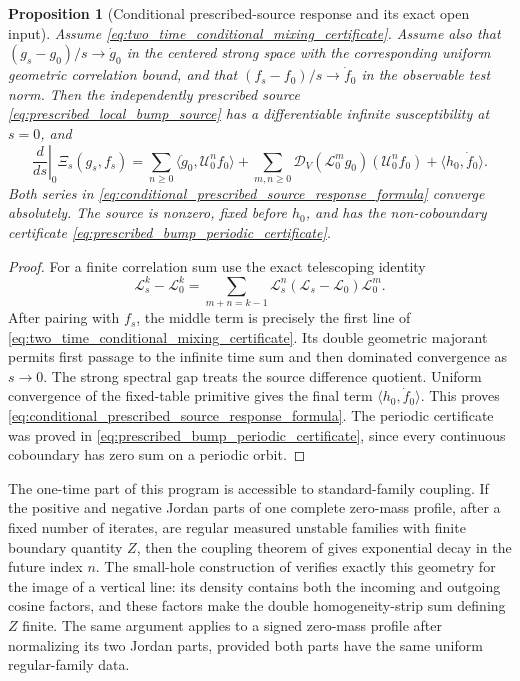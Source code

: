 \documentclass[11pt]{amsart}
\theoremstyle{compactplain}
\newtheorem*{proposition*}{Proposition}
\theoremstyle{compactdefinition}
\theoremstyle{compactremark}
\newcommand{\Ltransfer}{\mathscr L}
\begin{document}
\begin{proposition*}[Conditional prescribed-source response and its exact open input]
Assume \eqref{eq:two_time_conditional_mixing_certificate}.  Assume also that
\((g_s-g_0)/s\to\dot g_0\) in the centered strong space with the corresponding
uniform geometric correlation bound, and that
\((f_s-f_0)/s\to\dot f_0\) in the observable test norm.  Then the independently
prescribed source \eqref{eq:prescribed_local_bump_source} has a differentiable
infinite susceptibility at \(s=0\), and
\begin{equation}
\label{eq:conditional_prescribed_source_response_formula}
 \left.\frac d{ds}\right|_{0}\Xi_s(g_s,f_s)
 =\sum_{n\ge0}\langle\dot g_0,\mathscr U_0^nf_0\rangle
  +\sum_{m,n\ge0}
   \mathcal D_V(\Ltransfer_0^mg_0)(\mathscr U_0^nf_0)
  +\langle h_0,\dot f_0\rangle .
\end{equation}
Both series in \eqref{eq:conditional_prescribed_source_response_formula}
converge absolutely.  The source is nonzero, fixed before \(h_0\), and has the
non-coboundary certificate \eqref{eq:prescribed_bump_periodic_certificate}.
\end{proposition*}

\begin{proof}
For a finite correlation sum use the exact telescoping identity
\[
 \Ltransfer_s^k-\Ltransfer_0^k
 =\sum_{m+n=k-1}
   \Ltransfer_s^n(\Ltransfer_s-\Ltransfer_0)
   \Ltransfer_0^m .
\]
After pairing with \(f_s\), the middle term is precisely the first line of
\eqref{eq:two_time_conditional_mixing_certificate}.  Its double geometric
majorant permits first passage to the infinite time sum and then dominated
convergence as \(s\to0\).  The strong spectral gap treats the source
difference quotient.  Uniform convergence of the fixed-table primitive gives
the final term \(\langle h_0,\dot f_0\rangle\).  This proves
\eqref{eq:conditional_prescribed_source_response_formula}.  The periodic
certificate was proved in \eqref{eq:prescribed_bump_periodic_certificate},
since every continuous coboundary has zero sum on a periodic orbit.
\end{proof}

The one-time part of this program is accessible to standard-family coupling.
If the positive and negative Jordan parts of one complete zero-mass profile,
after a fixed number of iterates, are regular measured unstable families with
finite boundary quantity \(Z\), then the coupling theorem of
\cite{StenlundYoungZhang2013} gives exponential decay in the future index
\(n\).  The small-hole construction of \cite{Canestrari2026SmallHoles}
verifies exactly this geometry for the image of a vertical line: its density
contains both the incoming and outgoing cosine factors, and these factors
make the double homogeneity-strip sum defining \(Z\) finite.  The same
argument applies to a signed zero-mass profile after normalizing its two
Jordan parts, provided both parts have the same uniform regular-family data.
\end{document}

